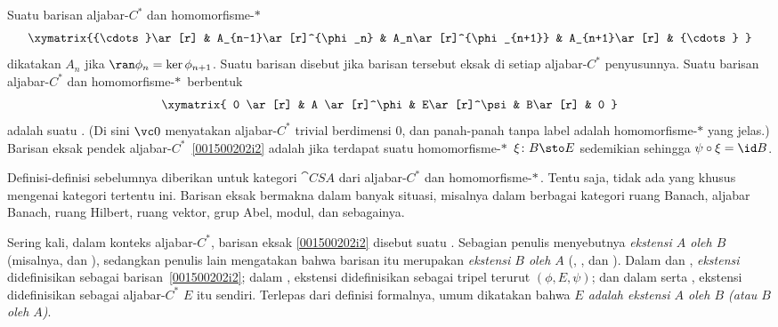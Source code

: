 \begin{defn} Suatu barisan aljabar-$C^*$ dan homomorfisme-$*\,$
   \[\xymatrix{{\cdots}\ar[r] & A_{n-1}\ar[r]^{\phi_n}
          & A_n\ar[r]^{\phi_{n+1}} & A_{n+1}\ar[r] & {\cdots}
   }\]
dikatakan
 $A_n$ jika $\ran \phi_n = \ker \phi_{n+1}$. Suatu barisan disebut
 jika barisan tersebut eksak di setiap aljabar-$C^*$ penyusunnya. Suatu barisan
aljabar-$C^*$ dan homomorfisme-$*\,$ berbentuk
   \begin{equation}\label{001500202i2}\xymatrix{
      0 \ar[r] & A \ar[r]^\phi & E\ar[r]^\psi & B\ar[r] & 0
   }\end{equation}
adalah suatu . (Di sini $\vc 0$ menyatakan aljabar-$C^*$ trivial
berdimensi $0$, dan panah-panah tanpa label adalah homomorfisme-$*$ yang jelas.) Barisan
eksak pendek aljabar-$C^*$~\eqref{001500202i2} adalah
 jika terdapat suatu homomorfisme-$*\,$ $\xi\colon B \sto E$ sedemikian
sehingga $\psi\circ\xi = \id B$.
\end{defn}

Definisi-definisi sebelumnya diberikan untuk kategori $\cat{CSA}$ dari aljabar-$C^*$ dan
homomorfisme-$*\,$. Tentu saja, tidak ada yang khusus mengenai kategori tertentu ini.
Barisan eksak bermakna dalam banyak situasi, misalnya dalam berbagai kategori ruang Banach,
aljabar Banach, ruang Hilbert, ruang vektor, grup Abel, modul, dan sebagainya.

Sering kali, dalam konteks aljabar-$C^*$, barisan eksak \eqref{001500202i2} disebut suatu
. Sebagian penulis menyebutnya \emph{ekstensi $A$ oleh $B$} (misalnya,
\cite{Wegge-Olsen:1993} dan \cite{Davidson:1996}), sedangkan penulis lain mengatakan bahwa
barisan itu merupakan \emph{ekstensi $B$ oleh $A$} (\cite{Murphy:1990},
\cite{Fillmore:1996}, dan \cite{Blackadar:2006}). Dalam \cite{Fillmore:1996} dan
\cite{Blackadar:2006}, \emph{ekstensi} didefinisikan sebagai barisan~\eqref{001500202i2};
dalam \cite{Wegge-Olsen:1993}, ekstensi didefinisikan sebagai tripel terurut
$(\phi,E,\psi)$; dan dalam \cite{Murphy:1990} serta \cite{Davidson:1996}, ekstensi
didefinisikan sebagai aljabar-$C^*$ $E$ itu sendiri. Terlepas dari definisi formalnya,
umum dikatakan bahwa \emph{$E$ adalah ekstensi $A$ oleh $B$ (atau $B$ oleh $A$)}.

